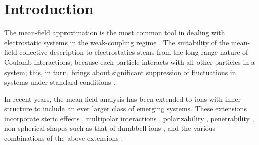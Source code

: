 \documentclass[pre,twocolumn,graphicx]{revtex4-1}
\begin{document}
\section{Introduction}

The mean-field approximation is the most common tool in dealing with electrostatic systems in the 
weak-coupling regime \cite{Rudi13,David18,Yan02}.  The suitability of the mean-field collective description 
to electrostatics stems from the long-range nature of Coulomb interactions;  because each particle interacts 
with all other particles in a system; this, in turn, brings about significant suppression of fluctuations in 
systems under standard conditions \cite{Frydel16c,Frydel17}.   


In recent years, the mean-field analysis has been extended to ions with inner structure to include 
an ever larger class of emerging systems.  These extensions incorporate steric effects 
\cite{David97,Frydel11a,Frydel12,Frydel12,Frydel14}, multipolar interactions \cite{David07,Rudi09}, 
polarizability \cite{Frydel11,Hatlo12}, penetrability 
\cite{Hansen11a,Hansen11b,Frydel13,Masters13,Levesque14,Frydel16a,Frydel18}, non-spherical 
shapes such as that of dumbbell 
ions \cite{Bohinc04,Bohinc08,Bohinc11,Bohinc12}, and the various combinations of the above extensions 
\cite{Frydel16b}.  
\end{document}
